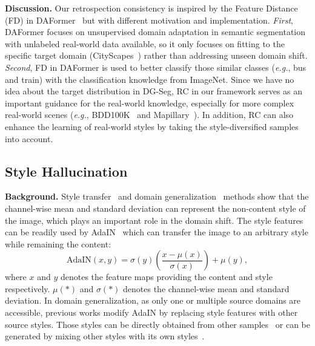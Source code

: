 \documentclass[runningheads]{llncs}
\def\eg{\emph{e.g.}} \def\Eg{\emph{E.g.}}
\begin{document}
\noindent\textbf{Discussion.} Our retrospection consistency is inspired by the Feature Distance (FD) in DAFormer~\cite{hoyer2021daformer} but with different motivation and implementation. \textit{First}, DAFormer focuses on unsupervised domain adaptation in semantic segmentation with unlabeled real-world data available, so it only focuses on fitting to the specific target domain (CityScapes~\cite{cityscapes}) rather than addressing unseen domain shift. \textit{Second}, FD in DAFormer is used to better classify those similar classes (\eg, bus and train) with the classification knowledge from ImageNet. Since we have no idea about the target distribution in DG-Seg, RC in our framework serves as an important guidance for the real-world knowledge, especially for more complex real-world scenes (\textit{e.g.}, BDD100K~\cite{bdd} and Mapillary~\cite{mapillary}). 
In addition, RC can also enhance the learning of real-world styles by taking the style-diversified samples into account.



\subsection{Style Hallucination}
\label{sec:sh}
\noindent\textbf{Background.} Style transfer~\cite{chen2021diverse,adain} and domain generalization~\cite{crossnorm,zhou2021mixstyle} methods show that the channel-wise mean and standard deviation can represent the non-content style of the image, which plays an important role in the domain shift. The style features can be readily used by AdaIN~\cite{adain} which can transfer the image to an arbitrary style while remaining the content:
\begin{equation}
    \text{AdaIN}(x, y)=\sigma(y)\left(\frac{x-\mu(x)}{\sigma(x)}\right)+\mu(y),
\end{equation}
where $x$ and $y$ denotes the feature maps providing the content and style respectively. $\mu(*)$ and $\sigma(*)$ denotes the channel-wise mean and standard deviation. In domain generalization, as only one or multiple source domains are accessible, previous works modify AdaIN by replacing style features with other source styles. Those styles can be directly obtained from other samples~\cite{crossnorm} or can be generated by mixing other styles with its own styles~\cite{zhou2021mixstyle}.
\end{document}
